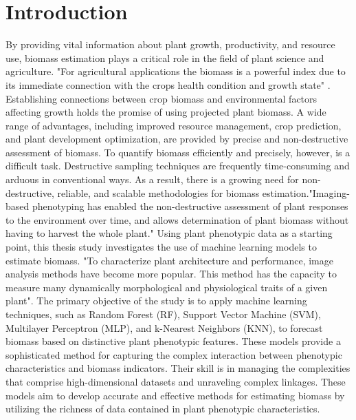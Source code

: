 \documentclass[a4paper,11pt]{report}%
\renewcommand{\\}{\vspace*{0.5\baselineskip} \newline}
\begin{document}
\tableofcontents
\newpage
{}



\chapter{Introduction}
By providing vital information about plant growth, productivity, and resource use, biomass estimation plays a critical role in the field of plant science and agriculture. "For agricultural applications the biomass is a powerful index due to its immediate connection with the crops health condition and growth state" \cite{1}. Establishing connections between crop biomass and environmental factors affecting growth holds the promise of using projected plant biomass. A wide range of advantages, including improved resource management, crop prediction, and plant development optimization, are provided by precise and non-destructive assessment of biomass. To quantify biomass efficiently and precisely, however, is a difficult task. Destructive sampling techniques are frequently time-consuming and arduous in conventional ways. As a result, there is a growing need for non-destructive, reliable, and scalable methodologies for biomass estimation."Imaging-based phenotyping has enabled the non-destructive assessment of plant responses to the environment over time, and allows determination of plant biomass without having to harvest the whole plant."\cite{3}
Using plant phenotypic data as a starting point, this thesis study investigates the use of machine learning models to estimate biomass. "To characterize plant architecture and performance, image analysis methods have become more popular. This method has the capacity to measure many dynamically morphological and physiological traits of a given plant".\cite{2} The primary objective of the study is to apply machine learning techniques, such as Random Forest (RF), Support Vector Machine (SVM), Multilayer Perceptron (MLP), and k-Nearest Neighbors (KNN), to forecast biomass based on distinctive plant phenotypic features. These models provide a sophisticated method for capturing the complex interaction between phenotypic characteristics and biomass indicators. Their skill is in managing the complexities that comprise high-dimensional datasets and unraveling complex linkages. These models aim to develop accurate and effective methods for estimating biomass by utilizing the richness of data contained in plant phenotypic characteristics.
\end{document}
